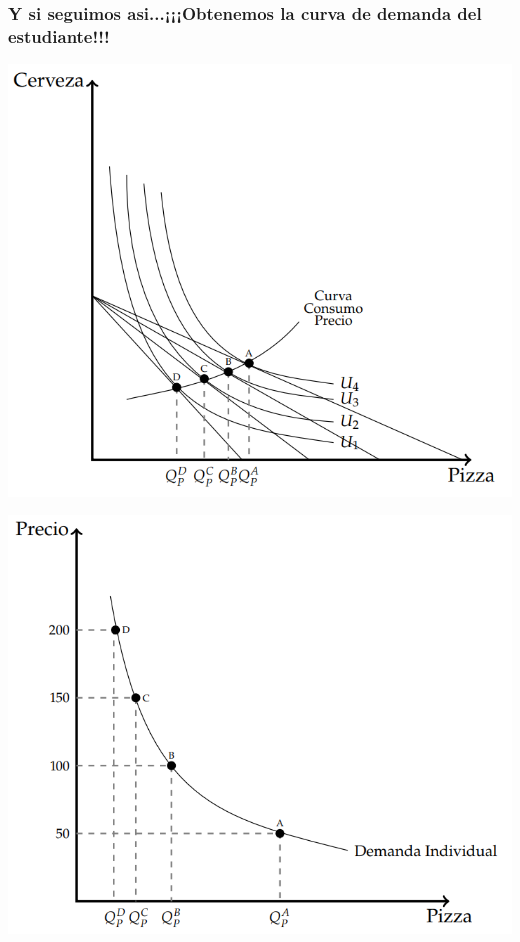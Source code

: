 \documentclass{beamer}
\begin{document}
\begin{frame}
\frametitle{Y si seguimos asi...¡¡¡Obtenemos la curva de demanda del estudiante!!!}
\begin{center}
  \begin{minipage}{0.48\textwidth}
      \includegraphics[width=\linewidth]{../Figures/C8.17.png}
  \end{minipage}\hfill
  \begin{minipage}{0.48\textwidth}
      \includegraphics[width=\linewidth]{../Figures/C8.18.png}
  \end{minipage}
\end{center}
\end{frame}
\end{document}
